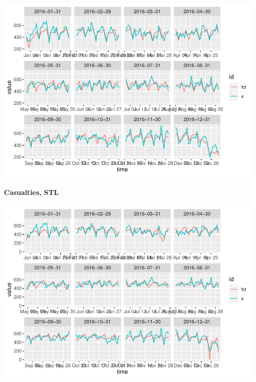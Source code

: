 \begin{Schunk}

\includegraphics[width=1\linewidth]{overview_files/figure-latex/unnamed-chunk-9-1} \end{Schunk}

\hypertarget{casualties-stl-1}{%
\paragraph{Casualties, STL}\label{casualties-stl-1}}

\begin{Schunk}

\includegraphics[width=1\linewidth]{overview_files/figure-latex/unnamed-chunk-10-1} \end{Schunk}



